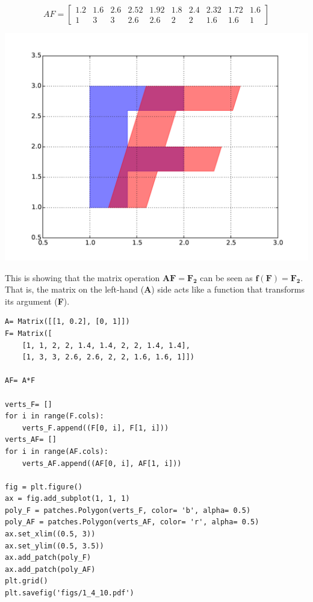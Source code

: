 \documentclass[a4paper]{article}
\begin{document}
\begin{equation}\label{eq:}
AF = \left[\begin{matrix}1.2 & 1.6 & 2.6 & 2.52 & 1.92 & 1.8 & 2.4 & 2.32 & 1.72 & 1.6\\1 & 3 & 3 & 2.6 & 2.6 & 2 & 2 & 1.6 & 1.6 & 1\end{matrix}\right]
\end{equation}

\includegraphics[width=\linewidth]{figs/1_4_10.pdf}

This is showing that the matrix operation $\mathbf{AF} = \mathbf{F_2}$ can be seen as
$\mathbf{f(F)}= \mathbf{F_2}$. That is, the matrix on the left-hand (\textbf{A})
side acts like a function that transforms its argument (\textbf{F}).

\begin{verbatim}
A= Matrix([[1, 0.2], [0, 1]])
F= Matrix([
    [1, 1, 2, 2, 1.4, 1.4, 2, 2, 1.4, 1.4],
    [1, 3, 3, 2.6, 2.6, 2, 2, 1.6, 1.6, 1]])

AF= A*F

verts_F= []
for i in range(F.cols):
    verts_F.append((F[0, i], F[1, i]))
verts_AF= []
for i in range(AF.cols):
    verts_AF.append((AF[0, i], AF[1, i]))

fig = plt.figure()
ax = fig.add_subplot(1, 1, 1)
poly_F = patches.Polygon(verts_F, color= 'b', alpha= 0.5)
poly_AF = patches.Polygon(verts_AF, color= 'r', alpha= 0.5)
ax.set_xlim((0.5, 3))
ax.set_ylim((0.5, 3.5))
ax.add_patch(poly_F)
ax.add_patch(poly_AF)
plt.grid()
plt.savefig('figs/1_4_10.pdf')
\end{verbatim}
\end{document}
